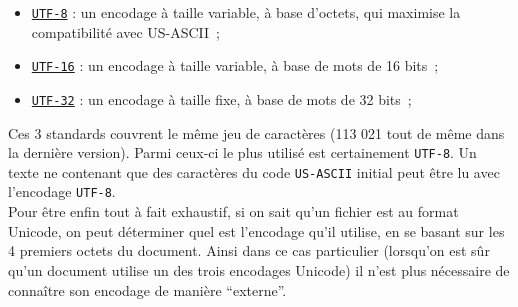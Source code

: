 \begin{itemize}
	\item 
	\href{http://en.wikipedia.org/wiki/UTF-8}{\texttt{UTF-8}} : un encodage
	à taille variable, à base d'octets, qui maximise la compatibilité avec
	US-ASCII~;
	\item
	\href{http://en.wikipedia.org/wiki/UTF-16}{\texttt{UTF-16}}
	: un encodage à taille variable, à base de mots de 16 bits~;
	\item
	\href{http://en.wikipedia.org/wiki/UTF-32}{\texttt{UTF-32}} : un
	encodage à taille fixe, à base de mots de 32 bits~;
\end{itemize}

Ces 3 standards couvrent le même jeu de caractères (113 021 tout de même
dans la dernière version). Parmi ceux-ci le plus utilisé est
certainement \texttt{UTF-8}. Un texte ne contenant que des caractères du
code \texttt{US-ASCII} initial peut être lu avec l'encodage
\texttt{UTF-8}.\\

Pour être enfin tout à fait exhaustif, si on sait qu'un fichier est au
format Unicode, on peut déterminer quel est l'encodage qu'il utilise, en
se basant sur les 4 premiers octets du document. Ainsi dans ce cas
particulier (lorsqu'on est sûr qu'un document utilise un des trois
encodages Unicode) il n'est plus nécessaire de connaître son encodage de
manière ``externe''.